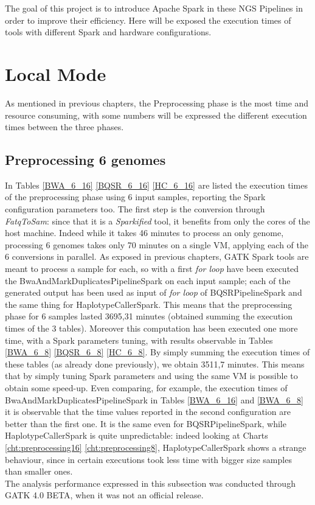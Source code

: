 The goal of this project is to introduce Apache Spark in these NGS Pipelines in order to improve their efficiency. Here will be exposed the execution times of tools with different Spark and hardware configurations. 



\section{Local Mode}
As mentioned in previous chapters, the Preprocessing phase is the most time and resource consuming, with some numbers will be expressed the different execution times between the three phases.

\subsection{Preprocessing 6 genomes}
In Tables \ref{BWA_6_16} \ref{BQSR_6_16} \ref{HC_6_16} are listed the execution times of the preprocessing phase using 6 input samples, reporting the Spark configuration parameters too. The first step is the conversion through \textit{FatqToSam}: since that it is a \textit{Sparkified} tool, it benefits from only the cores of the host machine. Indeed while it takes 46 minutes to process an only genome, processing 6 genomes takes only 70 minutes on a single VM, applying each of the 6 conversions in parallel.\newline
As exposed in previous chapters, GATK Spark tools are meant to process a sample for each, so with a first \textit{for loop} have been executed the BwaAndMarkDuplicatesPipelineSpark on each input sample; each of the generated output has been used as input of \textit{for loop} of BQSRPipelineSpark and the same thing for HaplotypeCallerSpark. This means that the preprocessing phase for 6 samples lasted 3695,31 minutes (obtained summing the execution times of the 3 tables).\newline
Moreover this computation has been executed one more time, with a Spark parameters tuning, with results observable in Tables \ref{BWA_6_8} \ref{BQSR_6_8} \ref{HC_6_8}. By simply summing the execution times of these tables (as already done previously), we obtain 3511,7 minutes. This means that by simply tuning Spark parameters and using the same VM is possible to obtain some speed-up. Even comparing, for example, the execution times of BwaAndMarkDuplicatesPipelineSpark in Tables \ref{BWA_6_16} and \ref{BWA_6_8} it is observable that the time values reported in the second configuration are better than the first one. It is the same even for BQSRPipelineSpark, while HaplotypeCallerSpark is quite unpredictable: indeed looking at Charts \ref{cht:preprocessing16} \ref{cht:preprocessing8}, HaplotypeCallerSpark shows a strange behaviour, since in certain executions took less time with bigger size samples than smaller ones.
\\[1\baselineskip]
The analysis performance expressed in this subsection was conducted through GATK 4.0 BETA, when it was not an official release.

